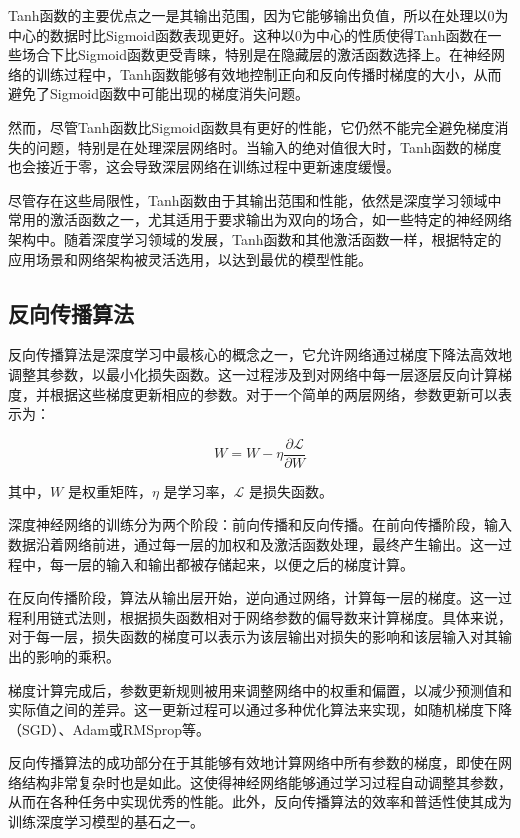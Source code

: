 Tanh函数的主要优点之一是其输出范围，因为它能够输出负值，所以在处理以0为中心的数据时比Sigmoid函数表现更好。这种以0为中心的性质使得Tanh函数在一些场合下比Sigmoid函数更受青睐，特别是在隐藏层的激活函数选择上。在神经网络的训练过程中，Tanh函数能够有效地控制正向和反向传播时梯度的大小，从而避免了Sigmoid函数中可能出现的梯度消失问题。

然而，尽管Tanh函数比Sigmoid函数具有更好的性能，它仍然不能完全避免梯度消失的问题，特别是在处理深层网络时。当输入的绝对值很大时，Tanh函数的梯度也会接近于零，这会导致深层网络在训练过程中更新速度缓慢。

尽管存在这些局限性，Tanh函数由于其输出范围和性能，依然是深度学习领域中常用的激活函数之一，尤其适用于要求输出为双向的场合，如一些特定的神经网络架构中。随着深度学习领域的发展，Tanh函数和其他激活函数一样，根据特定的应用场景和网络架构被灵活选用，以达到最优的模型性能。

\subsection{反向传播算法}\label{sec:background}
反向传播算法是深度学习中最核心的概念之一，它允许网络通过梯度下降法高效地调整其参数，以最小化损失函数。这一过程涉及到对网络中每一层逐层反向计算梯度，并根据这些梯度更新相应的参数。对于一个简单的两层网络，参数更新可以表示为：

\begin{equation}
    W = W - \eta \frac{\partial \mathcal{L}}{\partial W}
\end{equation}

其中，\(W\) 是权重矩阵，\(\eta\) 是学习率，\(\mathcal{L}\) 是损失函数。

深度神经网络的训练分为两个阶段：前向传播和反向传播。在前向传播阶段，输入数据沿着网络前进，通过每一层的加权和及激活函数处理，最终产生输出。这一过程中，每一层的输入和输出都被存储起来，以便之后的梯度计算。

在反向传播阶段，算法从输出层开始，逆向通过网络，计算每一层的梯度。这一过程利用链式法则，根据损失函数相对于网络参数的偏导数来计算梯度。具体来说，对于每一层，损失函数的梯度可以表示为该层输出对损失的影响和该层输入对其输出的影响的乘积。

梯度计算完成后，参数更新规则被用来调整网络中的权重和偏置，以减少预测值和实际值之间的差异。这一更新过程可以通过多种优化算法来实现，如随机梯度下降（SGD）、Adam或RMSprop等。

反向传播算法的成功部分在于其能够有效地计算网络中所有参数的梯度，即使在网络结构非常复杂时也是如此。这使得神经网络能够通过学习过程自动调整其参数，从而在各种任务中实现优秀的性能。此外，反向传播算法的效率和普适性使其成为训练深度学习模型的基石之一。
